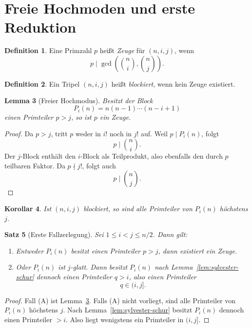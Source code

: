 \documentclass[12pt,a4paper]{article}
\theoremstyle{plain}
\newtheorem{theorem}{Satz}[section]
\newtheorem{lemma}[theorem]{Lemma}
\newtheorem{corollary}[theorem]{Korollar}
\theoremstyle{definition}
\newtheorem{definition}[theorem]{Definition}
\theoremstyle{remark}
\begin{document}
	\section{Freie Hochmoden und erste Reduktion}
	
	\begin{definition}
		Eine Primzahl \(p\) heißt \emph{Zeuge} für \((n,i,j)\), wenn
		\[
		p\mid \gcd\!\left(\binom ni,\binom nj\right).
		\]
	\end{definition}
	
	\begin{definition}
		Ein Tripel \((n,i,j)\) heißt \emph{blockiert}, wenn kein Zeuge existiert.
	\end{definition}
	
	\begin{lemma}[Freier Hochmodus]
		\label{lem:free-large-prime}
		Besitzt der Block
		\[
		P_i(n)=n(n-1)\cdots(n-i+1)
		\]
		einen Primteiler \(p>j\), so ist \(p\) ein Zeuge.
	\end{lemma}
	
	\begin{proof}
		Da \(p>j\), tritt \(p\) weder in \(i!\) noch in \(j!\) auf. Weil \(p\mid P_i(n)\), folgt
		\[
		p\mid \binom ni.
		\]
		Der \(j\)-Block enthält den \(i\)-Block als Teilprodukt, also ebenfalls den durch \(p\) teilbaren Faktor. Da \(p\nmid j!\), folgt auch
		\[
		p\mid \binom nj.
		\]
	\end{proof}
	
	\begin{corollary}
		\label{cor:j-smooth}
		Ist \((n,i,j)\) blockiert, so sind alle Primteiler von \(P_i(n)\) höchstens \(j\).
	\end{corollary}
	
	\begin{theorem}[Erste Fallzerlegung]
		\label{thm:first-reduction}
		Sei \(1\le i<j\le n/2\). Dann gilt:
		\begin{enumerate}[label=\textup{(\Alph*)}]
			\item Entweder \(P_i(n)\) besitzt einen Primteiler \(p>j\), dann existiert ein Zeuge.
			\item Oder \(P_i(n)\) ist \(j\)-glatt. Dann besitzt \(P_i(n)\) nach Lemma~\ref{lem:sylvester-schur} dennoch einen Primteiler \(q>i\), also einen Primteiler
			\[
			q\in(i,j].
			\]
		\end{enumerate}
	\end{theorem}
	
	\begin{proof}
		Fall (A) ist Lemma~\ref{lem:free-large-prime}. Falls (A) nicht vorliegt, sind alle Primteiler von \(P_i(n)\) höchstens \(j\). Nach Lemma~\ref{lem:sylvester-schur} besitzt \(P_i(n)\) dennoch einen Primteiler \(>i\). Also liegt wenigstens ein Primteiler in \((i,j]\).
	\end{proof}
	
\end{document}
